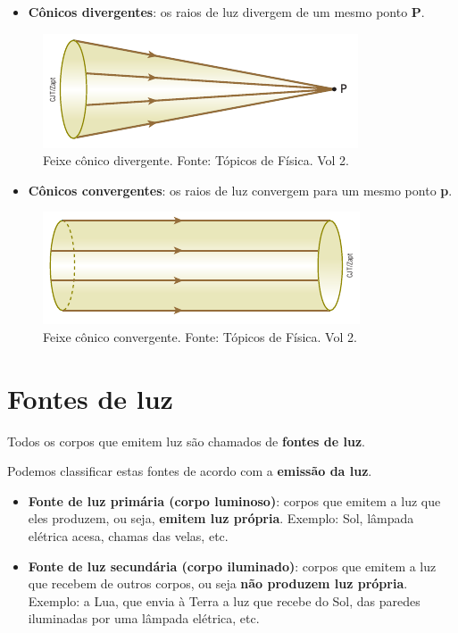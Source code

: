 \documentclass[11pt,twocolumn,oneside]{article}
\begin{document}
\begin{itemize}

\item \textbf{Cônicos divergentes}: os raios de luz divergem de um mesmo ponto \textbf{P}.

\end{itemize}


\begin{figure}[h]{}
\centering\includegraphics[width=2.5truein]{img2.png}
\caption{Feixe cônico divergente. Fonte: Tópicos de Física. Vol 2.}
\centering
\end{figure}

\begin{itemize}

\item \textbf{Cônicos convergentes}: os raios de luz convergem para um mesmo ponto \textbf{p}.

\end{itemize}


\begin{figure}[h]{}
\centering\includegraphics[width=2.5truein]{img3.png}
\caption{Feixe cônico convergente. Fonte: Tópicos de Física. Vol 2.}
\centering
\end{figure}

\hypertarget{x-fontes-de-luz}{\section{Fontes de luz}}
Todos os corpos que emitem luz são chamados de \textbf{fontes de luz}.


Podemos classificar estas fontes de acordo com a \textbf{emissão da luz}.


\begin{itemize}

\item \textbf{Fonte de luz primária (corpo luminoso)}: corpos que emitem a luz que eles produzem, ou seja, \textbf{emitem luz própria}. Exemplo: Sol, lâmpada elétrica acesa, chamas das velas, etc.

\item \textbf{Fonte de luz secundária (corpo iluminado)}: corpos que emitem a luz que recebem de outros corpos, ou seja \textbf{não produzem luz própria}. Exemplo: a Lua, que envia à Terra a luz que recebe do Sol, das paredes iluminadas por uma lâmpada elétrica, etc.

\end{itemize}
\end{document}
